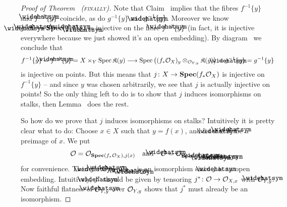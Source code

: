 \documentclass[a4paper,parskip=half,numbers=enddot, DIV=12]{scrreprt}
\begin{document}
\begin{proof}[Proof of Theorem~ \textsc{(finally)}]
Note that Claim~ implies that the fibres $f^{-1}\{y\}$ and $\roof{f}^{-1}\{y\}$ coincide, as do $g^{-1}\{y\}$ and $\roof{g}^{-1}\{y\}$. Moreover we know $\roof\jmath\colon \roof{X}\morphism\SPEC(\roof{f}_*\Oo_{\roof{X}})$ is injective on the fibre $\roof{f}^{-1}\{y\}$ (in fact, it is injective everywhere because we just showed it's an open embedding). By diagram~ we conclude that
\begin{align*}
	f^{-1}\{y\}=\roof{f}^{-1}\{y\}=X\times_Y\Spec \KK(y)\morphism \Spec \left((f_*\Oo_X)_y\otimes_{\Oo_{Y,y}}\KK(y)\right)=\roof{g}^{-1}\{y\}=g^{-1}\{y\}
\end{align*}
is injective on points. But this means that $j\colon X\morphism \SPEC(f_*\Oo_X)$ is injective on $f^{-1}\{y\}$ -- and since $y$ was chosen arbitrarily, we see that $j$ is actually injective on points! So the only thing left to do is to show that $j$ induces isomorphisms on stalks, then Lemma~ does the rest.

So how do we prove that $j$ induces isomorphisms on stalks? Intuitively it is pretty clear what to do: Choose $x\in X$ such that $y=f(x)$, and let $\roof{x}\in\roof{X}$ be a preimage of $x$. We put
\begin{align*}
	\Oo=\Oo_{\SPEC(f_*\Oo_X),j(x)}\quad\text{and}\quad\roof{\Oo}=\Oo_{\SPEC(\roof{f}_*\Oo_{\roof{X}}),\roof{\jmath}(\roof{x})}
\end{align*}
for convenience. Then $\roof{\jmath}^*\colon\roof{\Oo} \morphism \Oo_{\roof{X},\roof{x}}$ is an isomorphism since $\roof{\jmath}$ is an open embedding. Intuitively, $\roof{\jmath}^*$ should be given by tensoring $j^*\colon \Oo\morphism \Oo_{X,x}$ with $\roof{\Oo}_{Y,y}$. Now faithful flatness of $\roof{\Oo}_{Y,y}$ over $\mathcal{O}_{Y,y}$ shows that $j^*$ must already be an isomorphism.


\end{proof}
\end{document}
